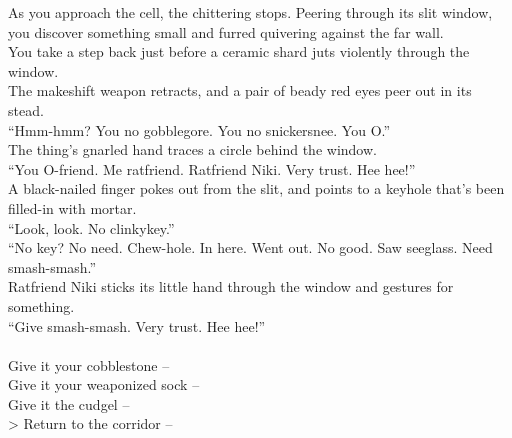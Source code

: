 As you approach the cell, the chittering stops. Peering through its slit window, you discover something small and furred quivering against the far wall.\\

You take a step back just before a ceramic shard juts violently through the window.\\

The makeshift weapon retracts, and a pair of beady red eyes peer out in its stead.\\
“Hmm-hmm? You no gobblegore. You no snickersnee. You O.”\\

The thing’s gnarled hand traces a circle behind the window.\\
“You O-friend. Me ratfriend. Ratfriend Niki. Very trust. Hee hee!”\\

A black-nailed finger pokes out from the slit, and points to a keyhole that’s been filled-in with mortar.\\
“Look, look. No clinkykey.”\\

“No key? No need. Chew-hole. In here. Went out. No good. Saw seeglass. Need smash-smash.”\\

Ratfriend Niki sticks its little hand through the window and gestures for something.\\
“Give smash-smash. Very trust. Hee hee!”\\

 \\
 Give it your cobblestone -- \\
 Give it your weaponized sock -- \\
 Give it the cudgel -- \\
> Return to the corridor -- 